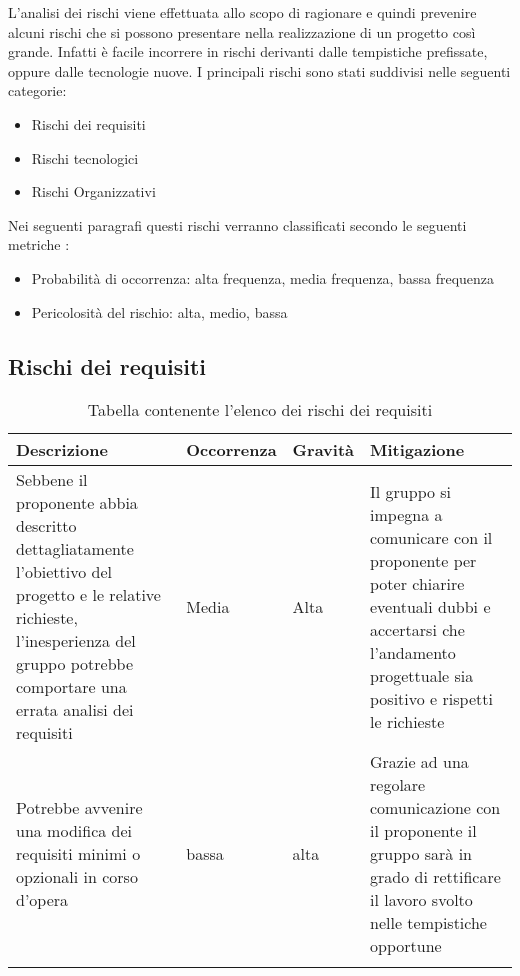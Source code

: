 \documentclass[../piano_di_progetto.tex]{subfiles}
\begin{document}
L’analisi dei rischi viene effettuata allo scopo di ragionare e quindi prevenire alcuni rischi che si possono presentare nella realizzazione di un progetto così grande. Infatti è facile incorrere in rischi derivanti dalle tempistiche prefissate, oppure dalle tecnologie nuove.
I principali rischi sono stati suddivisi nelle seguenti categorie:
\begin{itemize}
\item Rischi dei requisiti 
\item Rischi tecnologici 
\item Rischi Organizzativi
\end{itemize}
Nei seguenti paragrafi questi rischi verranno classificati secondo le seguenti metriche :
\begin{itemize}
\item Probabilità di occorrenza: alta frequenza, media frequenza, bassa frequenza
\item Pericolosità del rischio: alta, medio, bassa
\end{itemize}

\subsection{Rischi dei requisiti}%
\label{sub:rischi_req}

\begin{center}
	\begin{longtable}{| p{3.5cm} | p{2cm}|p{2cm}|p{3.5cm}|}
		\hline
		\rowcolor{lightgray}
		{\textbf{Descrizione}} & {\textbf{Occorrenza}} & {\textbf{Gravità}} & {\textbf{Mitigazione}} \\

		\hline
			Sebbene il proponente abbia descritto dettagliatamente l’obiettivo del progetto e le relative richieste, l’inesperienza del gruppo potrebbe comportare una errata analisi dei requisiti
			&
			Media
			& 
			Alta
			&
			Il gruppo si impegna a comunicare con il proponente per poter chiarire eventuali dubbi e accertarsi che l’andamento progettuale sia positivo e rispetti le richieste\\
			
			\hline
			Potrebbe avvenire una modifica dei requisiti minimi o opzionali in corso d’opera
			&
			bassa
			& 
			alta
			& 
			Grazie ad una regolare comunicazione con il proponente il gruppo sarà in grado di rettificare il lavoro svolto nelle tempistiche opportune\\
			\hline
\caption{Tabella contenente l'elenco dei rischi dei requisiti}
	\end{longtable}

\end{center}
\end{document}
